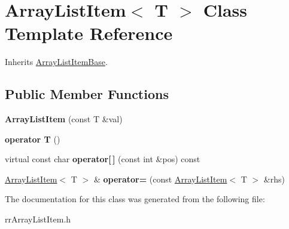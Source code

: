\hypertarget{classrrc_1_1_array_list_item}{\section{Array\+List\+Item$<$ T $>$ Class Template Reference}
\label{classrrc_1_1_array_list_item}
}


Inherits \hyperlink{classrrc_1_1_array_list_item_base}{Array\+List\+Item\+Base}.

\subsection*{Public Member Functions}
\begin{DoxyCompactItemize}
\item 
\hypertarget{classrrc_1_1_array_list_item_a7bf1467e3a4f3b2a7acb270653deacc4}{{\bfseries Array\+List\+Item} (const T \&val)}\label{classrrc_1_1_array_list_item_a7bf1467e3a4f3b2a7acb270653deacc4}

\item 
\hypertarget{classrrc_1_1_array_list_item_a4b15b6419d4ff99730ee9df795b90f61}{{\bfseries operator T} ()}\label{classrrc_1_1_array_list_item_a4b15b6419d4ff99730ee9df795b90f61}

\item 
\hypertarget{classrrc_1_1_array_list_item_a15f637c8efc2644cb9b7da0199bebffc}{virtual const char {\bfseries operator\mbox{[}$\,$\mbox{]}} (const int \&pos) const }\label{classrrc_1_1_array_list_item_a15f637c8efc2644cb9b7da0199bebffc}

\item 
\hypertarget{classrrc_1_1_array_list_item_a54c3771ff488a9aca825037a97acf4ca}{\hyperlink{classrrc_1_1_array_list_item}{Array\+List\+Item}$<$ T $>$ \& {\bfseries operator=} (const \hyperlink{classrrc_1_1_array_list_item}{Array\+List\+Item}$<$ T $>$ \&rhs)}\label{classrrc_1_1_array_list_item_a54c3771ff488a9aca825037a97acf4ca}

\end{DoxyCompactItemize}


The documentation for this class was generated from the following file\+:\begin{DoxyCompactItemize}
\item 
rr\+Array\+List\+Item.\+h\end{DoxyCompactItemize}
